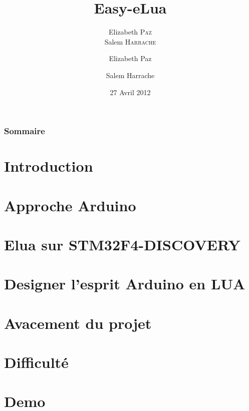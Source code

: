 \documentclass{beamer}
\title{Easy-eLua}
\author{Elizabeth \textsc{Paz} \\ Salem \textsc{Harrache}}
\institute{Polytech'Grenoble \\
Olivier \textsc{Richard} \\
Didier \textsc{Donsez} \\
}
\author[Elizabeth Paz, Salem Harrache]
{Elizabeth Paz \and Salem Harrache}
\date{27 Avril 2012}
\begin{document}
\begin{frame}
 \maketitle
\end{frame}

\begin{frame}
\frametitle{Sommaire}
\tableofcontents
\end{frame}

\section{Introduction}
\section{Approche Arduino}
\section{Elua sur STM32F4-DISCOVERY}
\section{Designer l'esprit Arduino en LUA}
\section{Avacement du projet}
\section{Difficulté}
\section{Demo}
\end{document}
